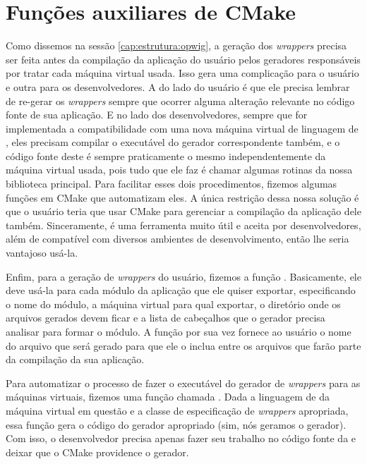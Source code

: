   \section{Funções auxiliares de CMake}
  \label{cap:atividades:cmake}
  
    Como dissemos na sessão \ref{cap:estrutura:opwig}, a geração dos
    \textit{wrappers} precisa ser feita antes da compilação da aplicação do
    usuário pelos geradores responsáveis por tratar cada máquina virtual usada.
    Isso gera uma complicação para o usuário e outra para os desenvolvedores. A
    do lado do usuário é que ele precisa lembrar de re-gerar os
    \textit{wrappers} sempre que ocorrer alguma alteração relevante no código
    fonte de sua aplicação. E no lado dos desenvolvedores, sempre que for
    implementada a compatibilidade com uma nova máquina virtual de linguagem de
    \script{}, eles precisam compilar o executável do gerador correspondente também,
    e o código fonte deste é sempre praticamente o mesmo independentemente da máquina
    virtual usada, pois tudo que ele faz é chamar algumas rotinas da nossa biblioteca
    principal. Para facilitar esses dois procedimentos, fizemos algumas funções em
    CMake que automatizam eles. A única restrição dessa nossa solução é que o usuário teria
    que usar CMake para gerenciar a compilação da aplicação dele também. Sinceramente,
    é uma ferramenta muito útil e aceita por desenvolvedores, além de compatível com
    diversos ambientes de desenvolvimento, então lhe seria vantajoso usá-la.
    
    Enfim, para a geração de \textit{wrappers} do usuário, fizemos a função
    . Basicamente, ele deve usá-la para cada módulo
    da aplicação que ele quiser exportar, especificando o nome do módulo, a
    máquina virtual para qual exportar, o diretório onde os arquivos gerados
    devem ficar e a lista de cabeçalhos que o gerador precisa analisar para formar
    o módulo. A função por sua vez fornece ao usuário o nome do arquivo que
    será gerado para que ele o inclua entre os arquivos que farão parte da
    compilação da sua aplicação.

    Para automatizar o processo de fazer o executável do gerador de
    \textit{wrappers} para as máquinas virtuais, fizemos uma função chamada
    . Dada a linguagem de \script{} da
    máquina virtual em questão e a classe de especificação de \textit{wrappers}
    apropriada, essa função gera o código do gerador apropriado (sim, nós geramos o
    gerador). Com isso, o desenvolvedor precisa apenas fazer seu trabalho no
    código fonte da  e deixar que o CMake providence o
    gerador.
